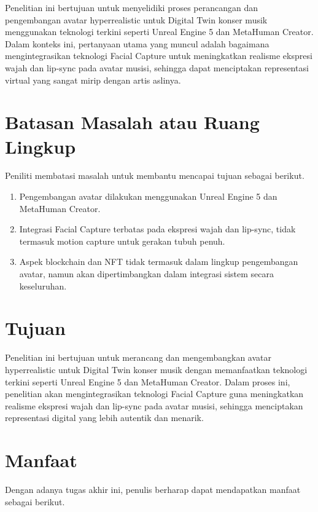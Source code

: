 
Penelitian ini bertujuan untuk menyelidiki proses perancangan dan pengembangan avatar hyperrealistic untuk Digital
Twin konser musik menggunakan teknologi terkini seperti Unreal Engine 5 dan MetaHuman Creator. Dalam konteks ini,
pertanyaan utama yang muncul adalah bagaimana mengintegrasikan teknologi Facial Capture untuk meningkatkan realisme
ekspresi wajah dan lip-sync pada avatar musisi, sehingga dapat menciptakan representasi virtual yang sangat mirip
dengan artis aslinya.

\section{Batasan Masalah atau Ruang Lingkup}

Peniliti membatasi masalah untuk membantu mencapai tujuan sebagai berikut.

\begin{enumerate}
    \item Pengembangan avatar dilakukan menggunakan Unreal Engine 5 dan MetaHuman Creator.
    \item Integrasi Facial Capture terbatas pada ekspresi wajah dan lip-sync, tidak termasuk motion capture untuk gerakan tubuh penuh.
    \item Aspek blockchain dan NFT tidak termasuk dalam lingkup pengembangan avatar, namun akan dipertimbangkan dalam integrasi sistem secara keseluruhan.
\end{enumerate}

\section{Tujuan}


Penelitian ini bertujuan untuk merancang dan mengembangkan avatar hyperrealistic untuk Digital Twin konser musik dengan memanfaatkan
teknologi terkini seperti Unreal Engine 5 dan MetaHuman Creator. Dalam proses ini, penelitian akan mengintegrasikan teknologi Facial
Capture guna meningkatkan realisme ekspresi wajah dan lip-sync pada avatar musisi, sehingga menciptakan representasi digital yang 
lebih autentik dan menarik. 

\section{Manfaat}
Dengan adanya tugas akhir ini, penulis berharap dapat mendapatkan manfaat sebagai berikut.

